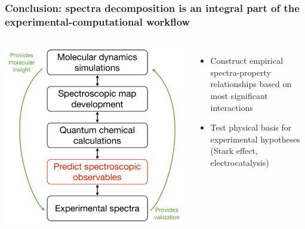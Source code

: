 \documentclass[%
    xcolor=usenames,dvipsnames,svgnames%
]{beamer}
\begin{document}
\begin{frame}
  \frametitle{Conclusion: spectra decomposition is an integral part of the experimental-computational workflow}
  \begin{columns}
    \includegraphics[width=\linewidth,keepaspectratio]{./figures/workflow.pdf}
    \begin{itemize}
    \item Construct empirical spectra-property relationships based on most significant interactions
    \item Test physical basis for experimental hypotheses (Stark effect, electrocatalysis)
    \end{itemize}
  \end{columns}
\end{frame}
\end{document}
